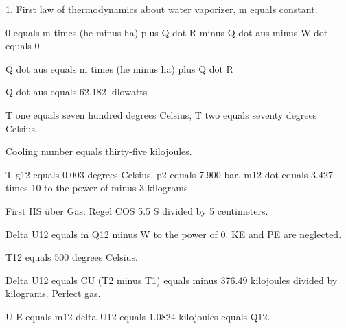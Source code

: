 1. First law of thermodynamics about water vaporizer, m equals constant.

0 equals m times (he minus ha) plus Q dot R minus Q dot aus minus W dot equals 0

Q dot aus equals m times (he minus ha) plus Q dot R

Q dot aus equals 62.182 kilowatts

T one equals seven hundred degrees Celsius, T two equals seventy degrees Celsius.

Cooling number equals thirty-five kilojoules.

T g12 equals 0.003 degrees Celsius. p2 equals 7.900 bar. m12 dot equals 3.427 times 10 to the power of minus 3 kilograms.

First HS über Gas: Regel COS 5.5 S divided by 5 centimeters.

Delta U12 equals m Q12 minus W to the power of 0. KE and PE are neglected.

T12 equals 500 degrees Celsius.

Delta U12 equals CU (T2 minus T1) equals minus 376.49 kilojoules divided by kilograms. Perfect gas.

U E equals m12 delta U12 equals 1.0824 kilojoules equals Q12.